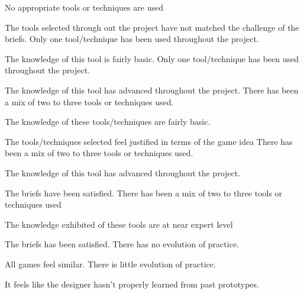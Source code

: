 \documentclass{../../fal_assignment}
\begin{document}
\begin{markingrubric}
	\grade\fail 	No appropriate tools or techniques are used
	\par 		The tools selected through out the project have not matched the challenge of the briefs.
	\grade 		Only one tool/technique has been used throughout the project.
	\par 		The knowledge of this tool is fairly basic.  
	\grade 		Only one tool/technique has been used throughout the project.
	\par 		The knowledge of this tool has advanced throughout the project.
	\grade 		There has been a mix of two to three tools or techniques used. 
	\par 		The knowledge of these tools/techniques are fairly basic. 
	\par		The tools/techniques selected feel justified in terms of the game idea
	\grade 		There has been a mix of two to three tools or techniques used.
	\par 		The knowledge of this tool has advanced throughout the project.
	\par		The briefs have been satisfied.     
	\grade 		There has been a mix of two to three tools or techniques used
	\par		The knowledge exhibited of these tools are at near expert level
	\par		The briefs has been satisfied.
	\grade\fail There has no evolution of practice.
	\par All games feel similar.
	\grade There is little evolution of practice.
	\par It feels like the designer hasn't properly learned from past prototypes.

\end{markingrubric}
\end{document}
